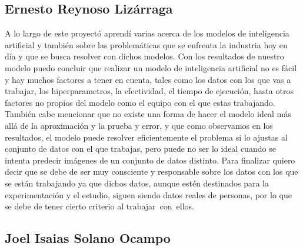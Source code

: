 \documentclass[runningheads]{llncs}
\begin{document}
\subsection*{Ernesto Reynoso Lizárraga}

A lo largo de este proyectó aprendí varias acerca de los modelos de inteligencia artificial y también sobre las problemáticas que se enfrenta la industria hoy en día y que se busca resolver con dichos modelos. Con los resultados de nuestro modelo puedo concluir que realizar un modelo de inteligencia artificial no es fácil y hay muchos factores a tener en cuenta, tales como los datos con los que vas a trabajar, los hiperparametros, la efectividad, el tiempo de ejecución, hasta otros factores no propios del modelo como el equipo con el que estas trabajando. También cabe mencionar que no existe una forma de hacer el modelo ideal más allá de la aproximación y la prueba y error, y que como observamos en los resultados, el modelo puede resolver eficientemente el problema si lo ajustas al conjunto de datos con el que trabajas, pero puede no ser lo ideal cuando se intenta predecir imágenes de un conjunto de datos distinto. Para finalizar quiero decir que se debe de ser muy consciente y responsable sobre los datos con los que se están trabajando ya que dichos datos, aunque estén destinados para la experimentación y el estudio, siguen siendo datos reales de personas, por lo que se debe de tener cierto criterio al trabajar con ellos.

\subsection*{Joel Isaias Solano Ocampo}
\end{document}
